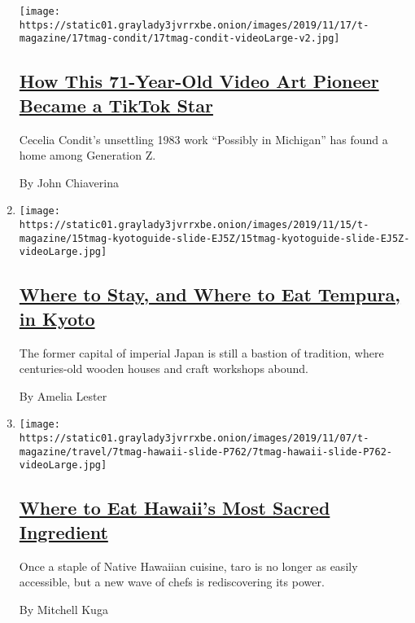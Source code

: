 \begin{enumerate}
  \texttt{[image: https://static01.graylady3jvrrxbe.onion/images/2019/11/17/t-magazine/17tmag-condit/17tmag-condit-videoLarge-v2.jpg]}

  \hypertarget{how-this-71-year-old-video-art-pioneer-became-a-tiktok-star}{%
  \subsection{\texorpdfstring{\href{/2019/11/06/t-magazine/possibly-in-michigan-tiktok-artist.html}{How
  This 71-Year-Old Video Art Pioneer Became a TikTok
  Star}}{How This 71-Year-Old Video Art Pioneer Became a TikTok Star}}\label{how-this-71-year-old-video-art-pioneer-became-a-tiktok-star}}

  Cecelia Condit's unsettling 1983 work ``Possibly in Michigan'' has
  found a home among Generation Z.

  By John Chiaverina
\item
  \texttt{[image: https://static01.graylady3jvrrxbe.onion/images/2019/11/15/t-magazine/15tmag-kyotoguide-slide-EJ5Z/15tmag-kyotoguide-slide-EJ5Z-videoLarge.jpg]}

  \hypertarget{where-to-stay-and-where-to-eat-tempura-in-kyoto}{%
  \subsection{\texorpdfstring{\href{/2019/11/18/t-magazine/kyoto-japan-travel-guide.html}{Where
  to Stay, and Where to Eat Tempura, in
  Kyoto}}{Where to Stay, and Where to Eat Tempura, in Kyoto}}\label{where-to-stay-and-where-to-eat-tempura-in-kyoto}}

  The former capital of imperial Japan is still a bastion of tradition,
  where centuries-old wooden houses and craft workshops abound.

  By Amelia Lester
\item
  \texttt{[image: https://static01.graylady3jvrrxbe.onion/images/2019/11/07/t-magazine/travel/7tmag-hawaii-slide-P762/7tmag-hawaii-slide-P762-videoLarge.jpg]}

  \hypertarget{where-to-eat-hawaiis-most-sacred-ingredient}{%
  \subsection{\texorpdfstring{\href{/2019/11/08/t-magazine/hawaii-restaurants.html}{Where
  to Eat Hawaii's Most Sacred
  Ingredient}}{Where to Eat Hawaii's Most Sacred Ingredient}}\label{where-to-eat-hawaiis-most-sacred-ingredient}}

  Once a staple of Native Hawaiian cuisine, taro is no longer as easily
  accessible, but a new wave of chefs is rediscovering its power.

  By Mitchell Kuga
\end{enumerate}


